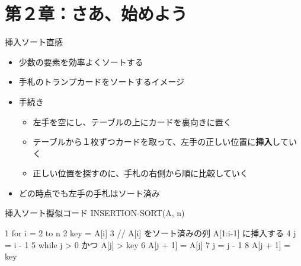 \documentclass[unicode,11pt,aspectratio=169,hide notes]{beamer} %
\begin{document}
\section*{第２章：さあ、始めよう}

\begin{frame}
  \sectionpage
\end{frame}

\begin{frame}{挿入ソート}{直感}
  \begin{itemize}
    \item 少数の要素を効率よくソートする
    \item 手札のトランプカードをソートするイメージ
    \item 手続き
    \begin{itemize}
      \item 左手を空にし、テーブルの上にカードを裏向きに置く
      \item テーブルから１枚ずつカードを取って、左手の正しい位置に\textbf{挿入}していく
      \item 正しい位置を探すのに、手札の右側から順に比較していく
    \end{itemize}
    \item どの時点でも左手の手札はソート済み
  \end{itemize}
\end{frame}

\begin{frame}[fragile]{挿入ソート}{擬似コード}
  INSERTION-SORT(A, n)
  \begin{semiverbatim}
1  for i = 2 to n
2    key = A[i]
3    // A[i] をソート済みの列 A[1:i-1] に挿入する
4    j = i - 1
5    while j > 0 かつ A[j] > key
6      A[j + 1] = A[j]
7      j = j - 1
8    A[j + 1] = key
  \end{semiverbatim}
\end{frame}

\end{document}
